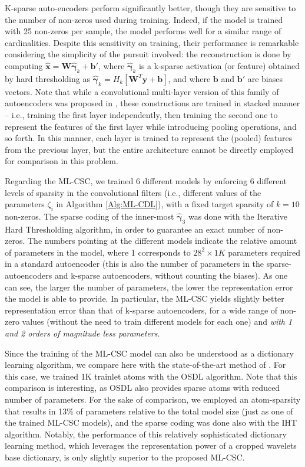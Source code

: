\documentclass[10pt,journal]{IEEEtran}
\def\x{{\mathbf x}}
\def\y{{\mathbf y}}
\def\W{{\mathbf W}}
\def\b{{\mathbf b}}
\def\gama{{\boldsymbol \gamma}}
\theoremstyle{plain}
\theoremstyle{definition}
\begin{document}
K-sparse auto-encoders perform significantly better, though they are sensitive to the number of non-zeros used during training. Indeed, if the model is trained with 25 non-zeros per sample, the model performs well for a similar range of cardinalities. Despite this sensitivity on training, their performance is remarkable considering the simplicity of the pursuit involved: the reconstruction is done by computing $\hat{\x} = \W\hat{\gama}_k+\b'$, where $\hat{\gama}_k$ is a k-sparse activation (or feature) obtained by hard thresholding as $\hat{\gama}_k = H_k\left[ \W^T\y + \b \right]$, and where $\b$ and $\b'$ are biases vectors. Note that while a convolutional multi-layer version of this family of autoencoders was proposed in \cite{makhzani2015winner}, these constructions are trained in stacked manner -- i.e., training the first layer independently, then training the second one to represent the features of the first layer while introducing pooling operations, and so forth. In this manner, each layer is trained to represent the (pooled) features from the previous layer, but the entire architecture cannot be directly employed for comparison in this problem.

Regarding the ML-CSC, we trained 6 different models by enforcing 6 different levels of sparsity in the convolutional filters (i.e., different values of the parameters $\zeta_i$ in Algorithm \ref{Alg:ML-CDL}), with a fixed target sparsity of $k=10$ non-zeros. The sparse coding of the inner-most $\hat{\gama}_3$ was done with the Iterative Hard Thresholding algorithm, in order to guarantee an exact number of non-zeros. The numbers pointing at the different models indicate the relative amount of parameters in the model, where 1 corresponds to $28^2\times 1K$ parameters required in a standard autoencoder (this is also the number of parameters in the sparse-autoencoders and k-sparse autoencoders, without counting the biases). As one can see, the larger the number of parameters, the lower the representation error the model is able to provide. In particular, the ML-CSC yields slightly better representation error than that of k-sparse autoencoders, for a wide range of non-zero values (without the need to train different models for each one) and \emph{with 1 and 2 orders of magnitude less parameters}.

Since the training of the ML-CSC model can also be understood as a dictionary learning algorithm, we compare here with the state-of-the-art method of \cite{Sulam2016}. For this case, we trained 1K trainlet atoms with the OSDL algorithm. Note that this comparison is interesting, as OSDL also provides sparse atoms with reduced number of parameters. For the sake of comparison, we employed an atom-sparsity that results in 13$\%$ of parameters relative to the total model size (just as one of the trained ML-CSC models), and the sparse coding was done also with the IHT algorithm. Notably, the performance of this relatively sophisticated dictionary learning method, which leverages the representation power of a cropped wavelets base dictionary, is only slightly superior to the proposed ML-CSC.
\end{document}
